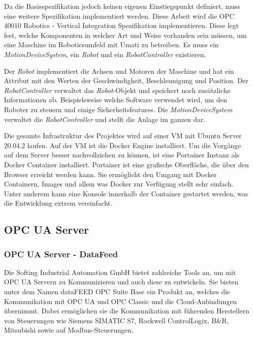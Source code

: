 \documentclass[a4paper, 12pt, oneside, toc=listofnumbered, bibliography=totoc]{scrbook}
\begin{document}
		Da die Basisspezifikation jedoch keinen eigenen Einstiegspunkt definiert, muss eine weitere Spezifikation implementiert werden. Diese Arbeit wird die OPC 40010 Robotics - Vertical Integration Spezifikation implementieren. Diese legt fest, welche Komponenten in welcher Art und Weise vorhanden sein müssen, um eine Maschine im Roboticsumfeld mit Umati zu betreiben. Es muss ein \textit{MotionDeviceSystem}, ein \textit{Robot} und ein \textit{RobotController} existieren. 
		
		Der \textit{Robot} implementiert die Achsen und Motoren der Maschine und hat ein Attribut mit den Werten der Geschwindigkeit, Beschleunigung und Position. Der \textit{RobotController} verwaltet das \textit{Robot}-Objekt und speichert noch zusätzliche Informationen ab. Beispielsweise welche Software verwendet wird, um den Roboter zu steuern und einige Sicherheitsfeatures. Die \textit{MotionDeviceSystem} verwaltet die \textit{RobotController} und stellt die Anlage im ganzen dar.
		
		Die gesamte Infrastruktur des Projektes wird auf einer VM mit Ubuntu Server 20.04.2 laufen. Auf der VM ist die Docker Engine installiert. Um die Vorgänge auf dem Server besser nachvollziehen zu können, ist eine Portainer Instanz als Docker Container installiert. Portainer ist eine grafische Oberfläche, die über den Browser erreicht werden kann. Sie ermöglicht den Umgang mit Docker Containern, Images und allem was Docker zur Verfügung stellt sehr einfach. Unter anderem kann eine Konsole innerhalb der Container gestartet werden, was die Entwicklung extrem vereinfacht. 
		
		\subsection{OPC UA Server}
		
			\subsubsection{OPC UA Server - DataFeed}
				
			Die Softing Industrial Automation GmbH bietet zahlreiche Tools an, um mit OPC UA Servern zu Kommunizieren und auch diese zu entwickeln. Sie bieten unter dem Namen dataFEED OPC Suite Base ein Produkt an, welches die Kommunikation mit OPC UA und OPC Classic und die Cloud-Anbindungen übernimmt. Dabei ermöglichen sie die Kommunikation mit führenden Herstellern von Steuerungen wie  Siemens SIMATIC S7, Rockwell ControlLogix, B\&R, Mitsubishi sowie auf Modbus-Steuerungen. \cite{noauthor_datafeed_nodate}
		
\end{document}
